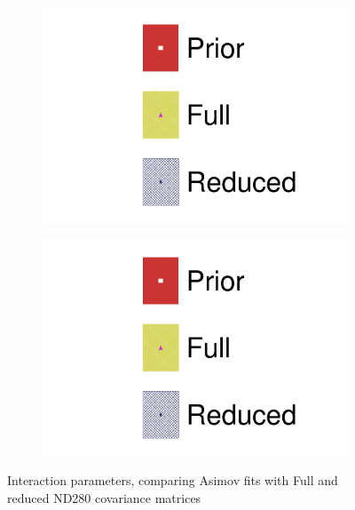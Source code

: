 \begin{figure}[h]
	\begin{subfigure}[t]{0.49\textwidth}
		\includegraphics[width=\textwidth,page=20, trim={0mm 0mm 0mm 9mm}, clip]{figures/mach3/2018/asimov/2018a_FixedCov_FullCov_Mpi_Asimov_merg_2018a_FixedCov_RedCov_Mpi_Asimov_merge}
	\end{subfigure}
	\begin{subfigure}[t]{0.49\textwidth}
		\includegraphics[width=\textwidth,page=21, trim={0mm 0mm 0mm 9mm}, clip]{figures/mach3/2018/asimov/2018a_FixedCov_FullCov_Mpi_Asimov_merg_2018a_FixedCov_RedCov_Mpi_Asimov_merge}
	\end{subfigure}
	\caption{Interaction parameters, comparing Asimov fits with Full and reduced ND280 covariance matrices}
	\label{fig:asimov_fit_2018_full_red_xsec}
\end{figure}

